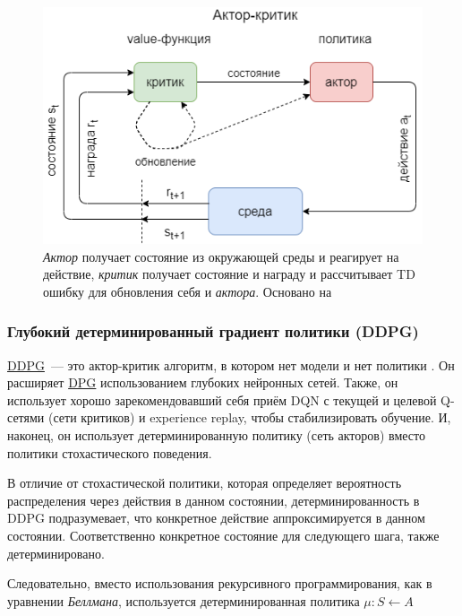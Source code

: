 \begin{figure}[ht!]
    \center
    \includegraphics [scale=0.60] {my_folder/images/ch1/RL-actor-critic.png}
    \caption{{\itshape Актор} получает состояние из окружающей среды и реагирует на действие, {\itshape критик} получает состояние и награду и рассчитывает TD ошибку для обновления себя и {\itshape актора}. Основано на \cite{Arulkumaran_2017}}
    \label{fig:ch1-RL-actor-critic}
\end{figure}

\subsubsection{Глубокий детерминированный градиент политики (DDPG)}

\hyperref[acr:ddpg]{DDPG}~--- это актор-критик алгоритм, в котором нет модели и нет политики \cite{lillicrap2015continuous}. Он расширяет \hyperref[acr:dpg]{DPG} использованием глубоких нейронных сетей. Также, он использует хорошо зарекомендовавший себя приём DQN с текущей и целевой Q-сетями (сети критиков) и experience replay, чтобы стабилизировать обучение. И, наконец, он использует детерминированную политику (сеть акторов) вместо политики стохастического поведения.

В отличие от стохастической политики, которая определяет вероятность распределения через действия в данном состоянии, детерминированность в DDPG подразумевает, что конкретное действие аппроксимируется в данном состоянии. Соответственно конкретное состояние для следующего шага, также детерминировано.

Следовательно, вместо использования рекурсивного программирования, как в уравнении {\itshape Беллмана}, используется детерминированная политика ${\mu : S \leftarrow A}$ \cite{lillicrap2015continuous}

